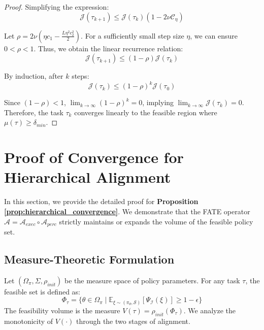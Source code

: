 \documentclass{article}
\theoremstyle{plain}
\theoremstyle{definition}
\theoremstyle{remark}
\begin{document}
\begin{proof}
    Simplifying the expression:
    \begin{equation}
        \mathcal{J}(\tau_{k+1}) \le \mathcal{J}(\tau_k) (1 - 2\nu \mathcal{C}_\eta)
    \end{equation}
    
    Let $\rho = 2\nu (\eta c_1 - \frac{L \eta^2 c_2^2}{2})$. For a sufficiently small step size $\eta$, we can ensure $0 < \rho < 1$. Thus, we obtain the linear recurrence relation:
    \begin{equation}
        \mathcal{J}(\tau_{k+1}) \le (1 - \rho) \mathcal{J}(\tau_k)
    \end{equation}
    
    By induction, after $k$ steps:
    \begin{equation}
        \mathcal{J}(\tau_k) \le (1 - \rho)^k \mathcal{J}(\tau_0)
    \end{equation}
    
    Since $(1-\rho) < 1$, $\lim_{k \to \infty} (1-\rho)^k = 0$, implying $\lim_{k \to \infty} \mathcal{J}(\tau_k) = 0$. Therefore, the task $\tau_k$ converges linearly to the feasible region where $\mu(\tau) \ge \delta_{min}$.
\end{proof}


\section{Proof of Convergence for Hierarchical Alignment}
\label{sec:Proof_of_Convergence_for_Hierarchical_Alignment}

In this section, we provide the detailed proof for \textbf{Proposition \ref{prop:hierarchical_convergence}}. We demonstrate that the FATE operator $\mathcal{A} = \mathcal{A}_{exec} \circ \mathcal{A}_{perc}$ strictly maintains or expands the volume of the feasible policy set.

\subsection{Measure-Theoretic Formulation}

Let $(\Omega_\pi, \Sigma, \rho_{init})$ be the measure space of policy parameters. For any task $\tau$, the feasible set is defined as:
\begin{equation}
    \Phi_\tau = \{ \theta \in \Omega_\pi \mid \mathbb{E}_{\xi \sim (\pi_\theta, \mathcal{S})} [\Psi_\mathcal{I}(\xi)] \ge 1 - \epsilon \}
\end{equation}
The feasibility volume is the measure $V(\tau) = \rho_{init}(\Phi_\tau)$. We analyze the monotonicity of $V(\cdot)$ through the two stages of alignment.
\end{document}
